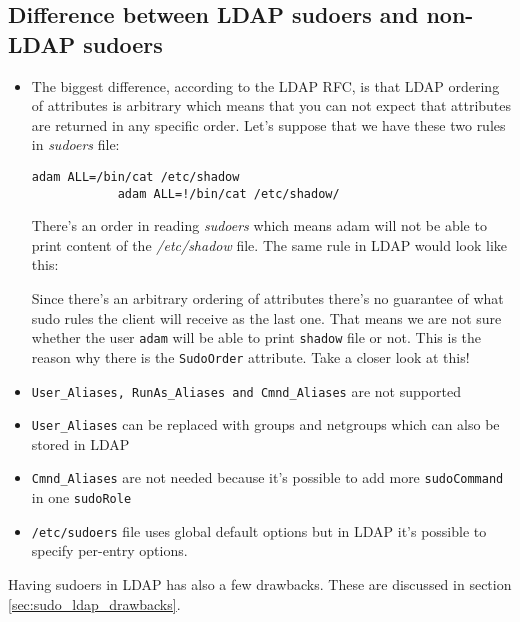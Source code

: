 \documentclass[12pt,a4paper,titlepage,final]{article}
\begin{document}
\subsection{Difference between LDAP sudoers and non-LDAP sudoers}
\begin{itemize} 
	\item The biggest difference, according to the LDAP RFC, is that LDAP ordering
		of attributes is arbitrary which means that you can not expect that
		attributes are returned in any specific order. 
		Let's suppose that we have these two rules in \emph{sudoers} file:

		\begin{lstlisting}[basicstyle=\ttfamily\small,frame=lines,showtabs=false]
			adam ALL=/bin/cat /etc/shadow
			adam ALL=!/bin/cat /etc/shadow/
		\end{lstlisting}

		There's an order in reading \emph{sudoers} which means adam will not be able
		to print content of the \emph{/etc/shadow} file. The same rule in LDAP would
		look like this:

		
		Since there's an arbitrary ordering of attributes there's no guarantee of what
		sudo rules the client will receive as the last one. That means we are not 
		sure whether the user \texttt{adam} will be able to print \texttt{shadow}
		file or not. This is the reason why there is the \texttt{SudoOrder}
		attribute. {\color{blue}Take a closer look at this!}

	\item \texttt{User\_Aliases, RunAs\_Aliases and Cmnd\_Aliases} are not supported
	\item \texttt{User\_Aliases} can be replaced with groups and netgroups which can
		also be stored in LDAP
	\item \texttt{Cmnd\_Aliases} are not needed because it's possible to add more
		\texttt{sudoCommand} in one \texttt{sudoRole}
	\item \texttt{/etc/sudoers} file uses global default options but in LDAP it's
		possible to specify per-entry options.
\end{itemize}

Having sudoers in LDAP has also a few drawbacks. These are discussed in section
\ref{sec:sudo_ldap_drawbacks}.
\end{document}
